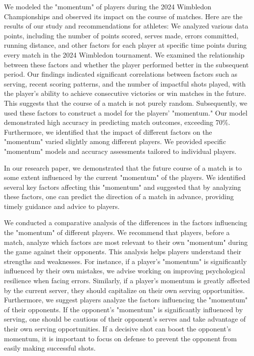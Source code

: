 \documentclass[UTF8]{ctexart} %
\begin{document}
We modeled the "momentum" of players during the 2024 Wimbledon Championships and observed its impact on the course of 
matches. Here are the results of our study and recommendations for athletes:
We analyzed various data points, including the number of points scored, serves made, errors committed, running distance, 
and other factors for each player at specific time points during every match in the 2024 Wimbledon tournament. We examined 
the relationship between these factors and whether the player performed better in the subsequent period. Our findings 
indicated significant correlations between factors such as serving, recent scoring patterns, and the number of impactful 
shots played, with the player's ability to achieve consecutive victories or win matches in the future. This suggests that
 the course of a match is not purely random. Subsequently, we used these factors to construct a model for the players' 
 "momentum." Our model demonstrated high accuracy in predicting match outcomes, exceeding 70\%.
Furthermore, we identified that the impact of different factors on the "momentum" varied slightly among different players. 
We provided specific "momentum" models and accuracy assessments tailored to individual players.

In our research paper, we demonstrated that the future course of a match is to some extent influenced by the current 
"momentum" of the players. We identified several key factors affecting this "momentum" and suggested that by analyzing 
these factors, one can predict the direction of a match in advance, providing timely guidance and advice to players.

We conducted a comparative analysis of the differences in the factors influencing the "momentum" of different players. 
We recommend that players, before a match, analyze which factors are most relevant to their own "momentum" during the game 
against their opponents. This analysis helps players understand their strengths and weaknesses. For instance, if a player's "momentum" is significantly influenced by their own mistakes, we advise working on improving psychological resilience when facing errors. Similarly, if a player's momentum is greatly affected by the current server, they should capitalize on their own serving opportunities.
Furthermore, we suggest players analyze the factors influencing the "momentum" of their opponents. If the opponent's 
"momentum" is significantly influenced by serving, one should be cautious of their opponent's serves and take advantage 
of their own serving opportunities. If a decisive shot can boost the opponent's momentum, it is important to focus on 
defense to prevent the opponent from easily making successful shots.
\end{document}
